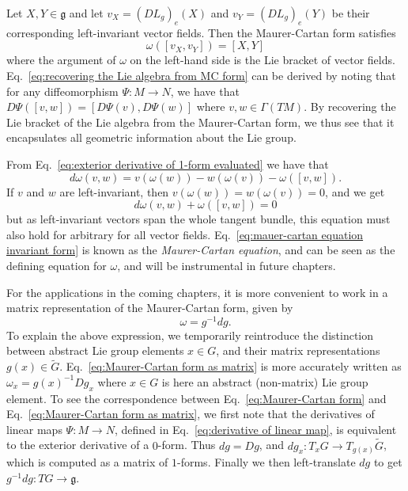 Let $X, Y \in \mathfrak{g}$ and let $v_X = (DL_g)_e(X)$ and $v_Y = (DL_g)_e(Y)$ be their corresponding left-invariant vector fields. Then the Maurer-Cartan form satisfies
\begin{equation} \label{eq:recovering the Lie algebra from MC form}
\omega([v_X, v_Y]) = [X, Y]
\end{equation}
where the argument of $\omega$ on the left-hand side is the Lie bracket of vector fields. Eq.~\ref{eq:recovering the Lie algebra from MC form} can be derived by noting that for any diffeomorphism $\Psi : M \to N$, we have that $D\Psi([v,w]) = [D\Psi(v), D\Psi(w)]$ where $v,w \in \Gamma(TM)$. By recovering the Lie bracket of the Lie algebra from the Maurer-Cartan form, we thus see that it encapsulates all geometric information about the Lie group.

From Eq.~\ref{eq:exterior derivative of 1-form evaluated} we have that
\begin{equation}
d \omega(v,w) = v(\omega(w)) - w(\omega(v)) - \omega([v,w]).
\end{equation}
If $v$ and $w$ are left-invariant, then $v(\omega(w)) = w(\omega(v)) = 0$, and we get
\begin{equation} \label{eq:mauer-cartan equation invariant form}
d \omega(v,w) + \omega([v,w]) = 0
\end{equation}
but as left-invariant vectors span the whole tangent bundle, this equation must also hold for arbitrary for all vector fields. Eq.~\ref{eq:mauer-cartan equation invariant form} is known as the \textit{Maurer-Cartan equation}, and can be seen as the defining equation for $\omega$, and will be instrumental in future chapters.

For the applications in the coming chapters, it is more convenient to work in a matrix representation of the Maurer-Cartan form, given by
\begin{equation} \label{eq:Maurer-Cartan form as matrix}
\omega = g^{-1} dg.
\end{equation}
To explain the above expression, we temporarily reintroduce the distinction between abstract Lie group elements $x \in G$, and their matrix representations $g(x) \in \tilde{G}$. Eq.~\ref{eq:Maurer-Cartan form as matrix} is more accurately written as $\omega_x = g(x)^{-1} Dg_x$ where $x \in G$ is here an abstract (non-matrix) Lie group element. To see the correspondence between Eq.~\ref{eq:Maurer-Cartan form} and Eq.~\ref{eq:Maurer-Cartan form as matrix}, we first note that the derivatives of linear maps $\Psi : M \to N$, defined in Eq.~\ref{eq:derivative of linear map}, is equivalent to the exterior derivative of a $0$-form. Thus $dg = Dg$, and $dg_x : T_x G \to T_{g(x)} \tilde{G}$, which is computed as a matrix of $1$-forms. Finally we then left-translate $dg$ to get $g^{-1} dg : TG \to \mathfrak{g}$.

